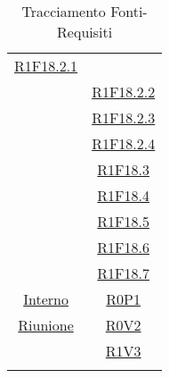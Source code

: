 \documentclass[../AnalisiDeiRequisiti.tex]{subfiles}
\begin{document}
\begin{longtable}{|c|c|}
\hyperlink{R1F18.2.1}{R1F18.2.1}\\& \hyperlink{R1F18.2.2}{R1F18.2.2}\\& \hyperlink{R1F18.2.3}{R1F18.2.3}\\& \hyperlink{R1F18.2.4}{R1F18.2.4}\\& \hyperlink{R1F18.3}{R1F18.3}\\& \hyperlink{R1F18.4}{R1F18.4}\\& \hyperlink{R1F18.5}{R1F18.5}\\& \hyperlink{R1F18.6}{R1F18.6}\\& \hyperlink{R1F18.7}{R1F18.7}\\\hline
	\hyperlink{Interno}{Interno} & \hyperlink{R0P1}{R0P1}\\\hline
	\hyperlink{Riunione}{Riunione} & \hyperlink{R0V2}{R0V2}\\& \hyperlink{R1V3}{R1V3}\\\hline
	\caption[Tracciamento Fonti-Requisiti]{Tracciamento Fonti-Requisiti}
	\label{tabella:fonti-requi}
\end{longtable}
\clearpage
\end{document}
